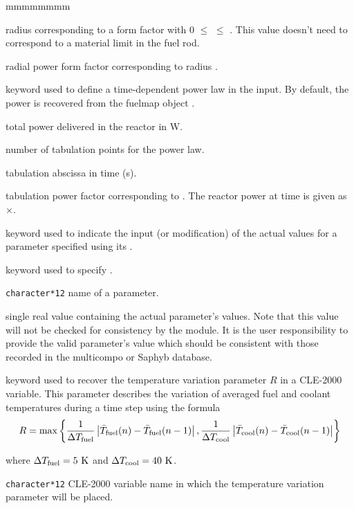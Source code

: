 \begin{ListeDeDescription}{mmmmmmmm}
\item[\dusa{rprad}] radius corresponding to a form factor with 0 $\le$  $\le$ . This value doesn't need to correspond to a
material limit in the fuel rod.

\item[\dusa{fprad}] radial power form factor corresponding to radius .

\item[\moc{POWER-LAW}] keyword used to define a time-dependent power law in the input. By default, the power is recovered from the fuelmap object .

\item[\dusa{tpow}] total power delivered in the reactor in W.

\item[\dusa{ntime}] number of tabulation points for the power law.

\item[\dusa{t(i)}] tabulation abscissa in time (s).

\item[\dusa{pow(i)}] tabulation power factor corresponding to . The reactor power at time  is given as $\times$.

\item[\moc{SET-PARAM}] keyword used to indicate the input (or modification)
of the actual values for a parameter specified using its .

\item[\moc{PNAME}] keyword used to specify .

\item[\dusa{PNAME}] \texttt{character*12} name of a parameter.

\item[\dusa{pvalue}] single real value containing the actual
parameter's values. Note that this value will not be checked for consistency
by the module. It is the user responsibility to provide the valid parameter's value
which should be consistent with those recorded in the multicompo or Saphyb database.

\item[\moc{PICK}]  keyword used to recover the temperature variation parameter $R$ in a CLE-2000 variable. This parameter describes the variation of
averaged fuel and coolant temperatures during a time step using the formula
$$ R=\max \left\{{1\over \Delta T_{\rm fuel}} \left|\bar T_{\rm fuel}(n)-\bar T_{\rm fuel}(n-1)\right|,
 {1\over \Delta T_{\rm cool}} \left|\bar T_{\rm cool}(n)-\bar T_{\rm cool}(n-1)\right| \right\}$$

\noindent where $\Delta T_{\rm fuel}=5 \ {\rm K}$ and $\Delta T_{\rm cool}=40 \ {\rm K}$.

\item[\dusa{ratio}] \texttt{character*12} CLE-2000 variable name in which the temperature variation parameter will be placed.

\end{ListeDeDescription}
\clearpage
